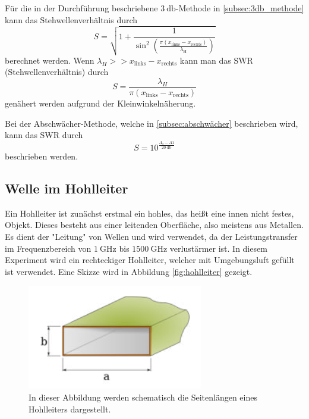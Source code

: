 Für die in der Durchführung beschriebene $\qty{3}{\decibel}$-Methode in \autoref{subsec:3db_methode} kann das Stehwellenverhältnis durch 
\begin{equation}
              \label{eqn:S_3dB}
              S = \sqrt{1+\frac{1}{\sin^2\left(\frac{\pi(x_\mathrm{links}-x_\mathrm{rechts})}{\lambda_\mathrm{H}}\right)}}
\end{equation}
berechnet werden. Wenn $\lambda_H >> x_\mathrm{links}-x_\mathrm{rechts}$ kann man das SWR (Stehwellenverhältnis) durch 
\begin{equation}
              \label{eqn:S_3dB_easy}
              S = \frac{\lambda_H}{\pi(x_\mathrm{links}-x_\mathrm{rechts})}
\end{equation}
genähert werden aufgrund der Kleinwinkelnäherung.

Bei der Abschwächer-Methode, welche in \autoref{subsec:abschwächer} beschrieben wird, kann das SWR durch 
\begin{equation}
              \label{eqn:S_abschwaecher}
              S = 10^\frac{A_2-A1}{\qty{20}{\decibel}}
\end{equation}
beschrieben werden.
\subsection{Welle im Hohlleiter}
\label{subsec:hohlleiter}
Ein Hohlleiter ist zunächst erstmal ein hohles, das heißt eine innen nicht festes, Objekt. Dieses besteht aus einer leitenden Oberfläche, also meistens aus Metallen. Es dient der 
"Leitung" von Wellen und wird verwendet, da der Leistungstransfer im Frequenzbereich von $\qty{1}{\giga\hertz}$ bis $\qty{1500}{\giga\hertz}$ verlustärmer ist. In diesem Experiment
wird ein rechteckiger Hohlleiter, welcher mit Umgebungsluft gefüllt ist verwendet. Eine Skizze wird in Abbildung \ref{fig:hohlleiter} gezeigt.

\begin{figure}
              \centering
              \includegraphics{content/hohlleiter.PNG}
              \caption{In dieser Abbildung werden schematisch die Seitenlängen eines Hohlleiters dargestellt.}
              \label{fig:stehwelle}
\end{figure}

